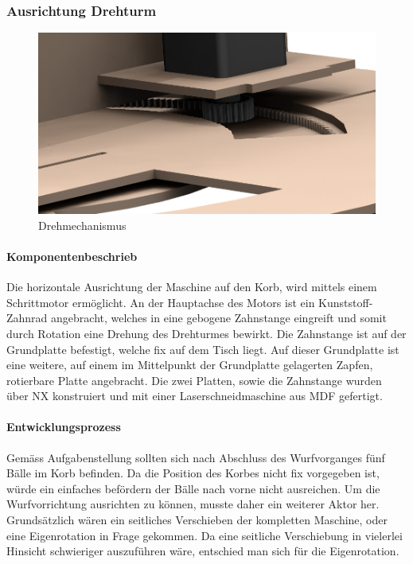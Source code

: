 \subsubsection{Ausrichtung Drehturm}
\begin{figure}[h!]
	\centering
	\includegraphics[width=\linewidth]{../../fig/Drehmechanismus}
	\caption{Drehmechanismus}
	\label{fig:Drehmechanismus}
\end{figure}
\paragraph{Komponentenbeschrieb}

Die horizontale Ausrichtung der Maschine auf den Korb, wird mittels einem Schrittmotor ermöglicht. An der Hauptachse des Motors ist ein Kunststoff-Zahnrad angebracht, welches in eine gebogene Zahnstange eingreift und somit durch Rotation eine Drehung des Drehturmes bewirkt. Die Zahnstange ist auf der Grundplatte befestigt, welche fix auf dem Tisch liegt. Auf dieser Grundplatte ist eine weitere, auf einem im Mittelpunkt der Grundplatte gelagerten Zapfen, rotierbare Platte angebracht. Die zwei Platten, sowie die Zahnstange wurden über NX konstruiert und mit einer Laserschneidmaschine aus MDF gefertigt.

\paragraph{Entwicklungsprozess}

Gemäss Aufgabenstellung sollten sich nach Abschluss des Wurfvorganges fünf Bälle im Korb befinden. Da die Position des Korbes nicht fix vorgegeben ist, würde ein einfaches befördern der Bälle nach vorne nicht ausreichen. Um die Wurfvorrichtung ausrichten zu können, musste daher ein weiterer Aktor her. Grundsätzlich wären ein seitliches Verschieben der kompletten Maschine, oder eine Eigenrotation in Frage gekommen. Da eine seitliche Verschiebung in vielerlei Hinsicht schwieriger auszuführen wäre, entschied man sich für die Eigenrotation.
